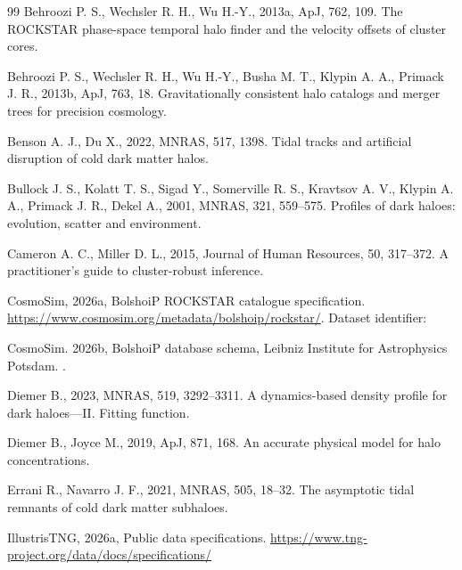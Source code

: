 \begin{thebibliography}{99}
Behroozi P. S., Wechsler R. H., Wu H.-Y., 2013a, ApJ, 762, 109. The ROCKSTAR phase-space temporal halo finder and the velocity offsets of cluster cores. 

Behroozi P. S., Wechsler R. H., Wu H.-Y., Busha M. T., Klypin A. A., Primack J. R., 2013b, ApJ, 763, 18. Gravitationally consistent halo catalogs and merger trees for precision cosmology. 

Benson A. J., Du X., 2022, MNRAS, 517, 1398. Tidal tracks and artificial disruption of cold dark matter halos. 

Bullock J. S., Kolatt T. S., Sigad Y., Somerville R. S., Kravtsov A. V., Klypin A. A., Primack J. R., Dekel A., 2001, MNRAS, 321, 559--575. Profiles of dark haloes: evolution, scatter and environment. 

Cameron A. C., Miller D. L., 2015, Journal of Human Resources, 50, 317--372. A practitioner's guide to cluster-robust inference. 

CosmoSim, 2026a, BolshoiP ROCKSTAR catalogue specification. \url{https://www.cosmosim.org/metadata/bolshoip/rockstar/}. Dataset identifier: 

 CosmoSim. 2026b, BolshoiP database schema, Leibniz Institute for Astrophysics Potsdam. . 

Diemer B., 2023, MNRAS, 519, 3292--3311. A dynamics-based density profile for dark haloes---II. Fitting function. 

Diemer B., Joyce M., 2019, ApJ, 871, 168. An accurate physical model for halo concentrations. 

Errani R., Navarro J. F., 2021, MNRAS, 505, 18--32. The asymptotic tidal remnants of cold dark matter subhaloes. 

IllustrisTNG, 2026a, Public data specifications. \url{https://www.tng-project.org/data/docs/specifications/}


\end{thebibliography}
